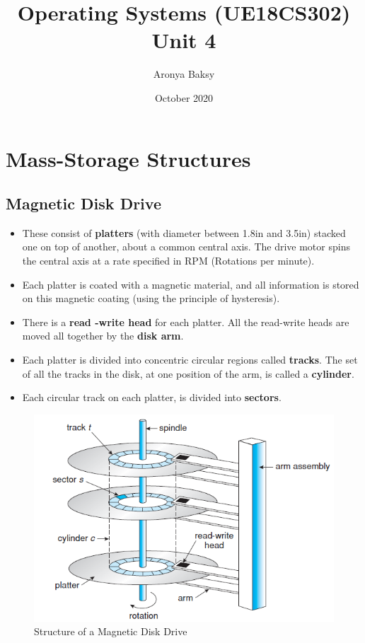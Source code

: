 \documentclass{article}
\title{Operating Systems (UE18CS302)\\
    \large Unit 4}
\author{Aronya Baksy}
\date{October 2020}
\theoremstyle{plain}
\theoremstyle{definition}
\begin{document}
    \maketitle
\section{Mass-Storage Structures}
\subsection{Magnetic Disk Drive}
\begin{itemize}
    \item These consist of \textbf{platters} (with diameter between 1.8in and 3.5in) stacked one on top of another, about a common central axis. The drive motor spins the central axis at a rate specified in RPM (Rotations per minute). 
    
    \item Each platter is coated with a magnetic material, and all information is stored on this magnetic coating (using the principle of hysteresis). 
    
    \item There is a \textbf{read -write head} for each platter. All the read-write heads are moved all together by the \textbf{disk arm}.  
    
    \item Each platter is divided into concentric circular regions called \textbf{tracks}. The set of all the tracks in the disk, at one position of the arm, is called a \textbf{cylinder}. 
    
    \item Each circular track on each platter, is divided into \textbf{sectors}. 
\end{itemize}
\begin{figure}[!h]
    \centering
    \includegraphics[scale=0.5]{os1.png}
    \caption{Structure of a Magnetic Disk Drive}
    \label{0}
\end{figure}
\end{document}
